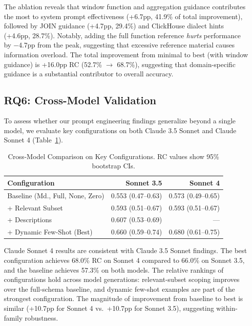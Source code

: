 \documentclass[sigconf, nonacm]{acmart}
\begin{document}
The ablation reveals that window function and aggregation guidance contributes the most to system prompt effectiveness (+6.7pp, 41.9\% of total improvement), followed by JOIN guidance (+4.7pp, 29.4\%) and ClickHouse dialect hints (+4.6pp, 28.7\%). Notably, adding the full function reference \emph{hurts} performance by $-$4.7pp from the peak, suggesting that excessive reference material causes information overload. The total improvement from minimal to best (with window guidance) is +16.0pp RC (52.7\% $\rightarrow$ 68.7\%), suggesting that domain-specific guidance is a substantial contributor to overall accuracy.

\subsection{RQ6: Cross-Model Validation}
\label{sec:crossmodel}

To assess whether our prompt engineering findings generalize beyond a single model, we evaluate key configurations on both Claude 3.5 Sonnet and Claude Sonnet 4 (Table~\ref{tab:crossmodel}).

\begin{table}[t]
\caption{Cross-Model Comparison on Key Configurations. RC values show 95\% bootstrap CIs.}
\label{tab:crossmodel}
\centering
\footnotesize
\begin{tabular}{lrr}
\toprule
\textbf{Configuration} & \textbf{Sonnet 3.5} & \textbf{Sonnet 4} \\
\midrule
Baseline (Md., Full, None, Zero) & 0.553 (0.47--0.63) & 0.573 (0.49--0.65) \\
+ Relevant Subset & 0.593 (0.51--0.67) & 0.593 (0.51--0.67) \\
+ Descriptions & 0.607 (0.53--0.69) & --- \\
+ Dynamic Few-Shot (Best) & 0.660 (0.59--0.74) & 0.680 (0.61--0.75) \\
\bottomrule
\end{tabular}
\end{table}

Claude Sonnet 4 results are consistent with Claude 3.5 Sonnet findings. The best configuration achieves 68.0\% RC on Sonnet 4 compared to 66.0\% on Sonnet 3.5, and the baseline achieves 57.3\% on both models. The relative rankings of configurations hold across model generations: relevant-subset scoping improves over the full-schema baseline, and dynamic few-shot examples are part of the strongest configuration. The magnitude of improvement from baseline to best is similar (+10.7pp for Sonnet 4 vs.\ +10.7pp for Sonnet 3.5), suggesting within-family robustness.
\end{document}
